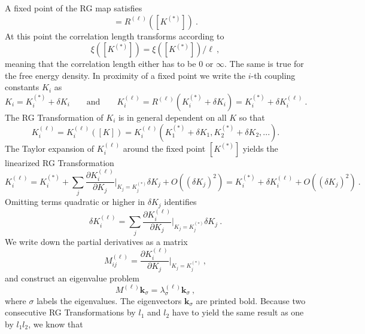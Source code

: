 	A fixed point of the RG	map satisfies
	\begin{equation}
		[K^{(*)}] =	R^{(\ell)}\left([K^{(*)}]\right) ~.
	\end{equation}
	At this point the correlation length transforms according to
	\begin{equation}
		\xi\left([K^{(*)}]\right) =	\xi\left([K^{(*)}]\right) / \ell~,
	\end{equation}
	meaning that the correlation length either has to be $0$ or $\infty$. The same is true for the free energy density. In proximity of a fixed point we write the $i$-th coupling constants $K_i$ as
	\begin{equation}
		K_i =	K_i^{(*)} + \delta K_i \qquad \text{and} \qquad K_i^{(\ell)} =	R^{(\ell)}(K_i^{(*)} + \delta K_i) =	K_i^{(*)} + \delta K_i^{(\ell)}~.
	\end{equation}
	The RG Transformation of $K_i$ is in general dependent on all $K$ so that
	\begin{equation}
		K^{(\ell)}_i =	K^{(\ell)}_i([K]) =	K^{(\ell)}_i(K_1^{(*)} + \delta K_1, K_2^{(*)} + \delta K_2, ...).
	\end{equation}
	The Taylor expansion of $K_i^{(\ell)}$ around the fixed point $[K^{(*)}]$ yields the linearized RG Transformation
	\begin{equation} \label{Eq::linearized-RG}
		K_i^{(\ell)} =	K_i^{(*)} + \sum_j \frac{\partial K_i^{(\ell)}}{\partial K_j} \bigg |_{K_j = K_j^{(*)}} \delta K_j + O((\delta K_j)^2) = K_i^{(*)} + \delta K_i^{(\ell)} + O((\delta K_j)^2) ~.
	\end{equation}
	Omitting terms quadratic or higher in $\delta K_j$ identifies
	\begin{equation}
		\delta K_i^{(\ell)} =	\sum_j \frac{\partial K_i^{(\ell)}}{\partial K_j} \bigg |_{K_j = K_j^{(*)}} \delta K_j~.
	\end{equation}
	We write down the partial derivatives as a matrix
	\begin{equation}
		M^{(\ell)}_{ij} =	\frac{\partial K_i^{(\ell)}}{\partial K_j} \bigg |_{K_j = K_j^{(*)}}~,
	\end{equation}
	and construct an eigenvalue problem
	\begin{equation} \label{ev-problem}
		M^{(\ell)} \boldsymbol{k}_{\sigma} =	\lambda_{\sigma}^{(\ell)} \boldsymbol{k}_{\sigma}~,
	\end{equation}
	where $\sigma$ labels the eigenvalues. The eigenvectors $\boldsymbol{k}_\sigma$ are printed bold.  Because two consecutive RG Transformations by $l_1$ and $l_2$ have to yield the same result as one  by $l_1l_2$, we know that
